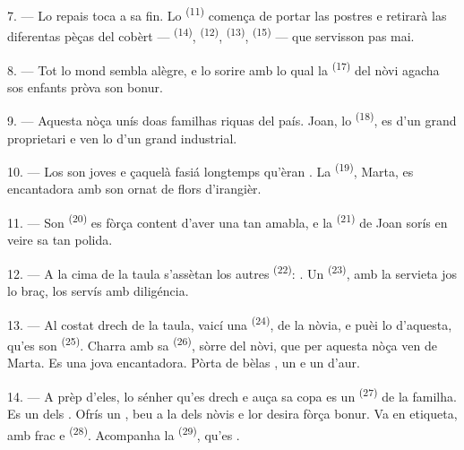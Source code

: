 7. --- Lo repais toca a sa fin. Lo  \textsuperscript{(11)}
comença de portar las postres e retirarà las diferentas pèças del cobèrt ---
 \textsuperscript{(14)}, 
\textsuperscript{(12)},  \textsuperscript{(13)},
 \textsuperscript{(15)} --- que servisson pas mai.

\VUsaut{3.0mm}

8. --- Tot lo mond sembla alègre, e lo sorire amb lo qual la 
\textsuperscript{(17)} del nòvi agacha sos enfants pròva son bonur.

9. --- Aquesta nòça unís doas familhas riquas del país. Joan, lo 
\textsuperscript{(18)}, es  d'un grand proprietari e ven lo
 d'un grand industrial.

10. --- Los  son joves e çaquelà fasiá longtemps qu'èran
. La  \textsuperscript{(19)}, Marta, es
encantadora amb son  ornat de flors d'irangièr.

11. --- Son  \textsuperscript{(20)} es fòrça content d'aver una
 tan amabla, e la  \textsuperscript{(21)} de Joan
sorís en veire sa  tan polida.

12. --- A la cima de la taula s'assètan los autres 
\textsuperscript{(22)}: . Un  \textsuperscript{(23)}, amb la servieta jos lo braç, los servís amb
diligéncia.

\VUsaut{3.0mm}

13. --- Al costat drech de la taula, vaicí una 
\textsuperscript{(24)},  de la nòvia, e puèi lo 
d'aquesta, qu'es son  \textsuperscript{(25)}. Charra amb sa
 \textsuperscript{(26)}, sòrre del nòvi, que per aquesta nòça
ven  de Marta. Es una jova encantadora. Pòrta de bèlas
, un  e un  d'aur.

14. --- A prèp d'eles, lo sénher qu'es drech e auça sa copa es un 
\textsuperscript{(27)} de la familha. Es un dels .
Ofrís un , beu a la  dels nòvis e lor desira fòrça
bonur. Va en etiqueta, amb frac e 
\textsuperscript{(28)}. Acompanha la  \textsuperscript{(29)}, qu'es
.

